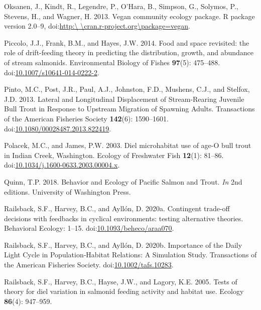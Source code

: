 \documentclass[]{article}
\begin{document}
\hypertarget{ref-Oskanen2013}{}
Oksanen, J., Kindt, R., Legendre, P., O'Hara, B., Simpson, G., Solymos,
P., Stevens, H., and Wagner, H. 2013. Vegan community ecology package. R
package version 2.0--9,
doi:\href{https://doi.org/http:/\%20/cran.r-project.org/package=vegan}{http:\textbackslash{} \textbackslash{}cran.r-project.org\textbackslash{}package=vegan}.

\hypertarget{ref-Piccolo2014}{}
Piccolo, J.J., Frank, B.M., and Hayes, J.W. 2014. Food and space
revisited: the role of drift-feeding theory in predicting the
distribution, growth, and abundance of stream salmonids. Environmental
Biology of Fishes \textbf{97}(5): 475--488.
doi:\href{https://doi.org/10.1007/s10641-014-0222-2}{10.1007/s10641-014-0222-2}.

\hypertarget{ref-Pinto2013}{}
Pinto, M.C., Post, J.R., Paul, A.J., Johnston, F.D., Mushens, C.J., and
Stelfox, J.D. 2013. Lateral and Longitudinal Displacement of
Stream-Rearing Juvenile Bull Trout in Response to Upstream Migration of
Spawning Adults. Transactions of the American Fisheries Society
\textbf{142}(6): 1590--1601.
doi:\href{https://doi.org/10.1080/00028487.2013.822419}{10.1080/00028487.2013.822419}.

\hypertarget{ref-Polacek2003a}{}
Polacek, M.C., and James, P.W. 2003. Diel microhabitat use of age-O bull
trout in Indian Creek, Washington. Ecology of Freshwater Fish
\textbf{12}(1): 81--86.
doi:\href{https://doi.org/10.1034/j.1600-0633.2003.00004.x}{10.1034/j.1600-0633.2003.00004.x}.

\hypertarget{ref-Quinn2018}{}
Quinn, T.P. 2018. Behavior and Ecology of Pacific Salmon and Trout.
\emph{In} 2nd editions. University of Washington Press.

\hypertarget{ref-Railsback2020}{}
Railsback, S.F., Harvey, B.C., and Ayllón, D. 2020a. Contingent
trade-off decisions with feedbacks in cyclical environments: testing
alternative theories. Behavioral Ecology: 1--15.
doi:\href{https://doi.org/10.1093/beheco/araa070}{10.1093/beheco/araa070}.

\hypertarget{ref-Railsback2020b}{}
Railsback, S.F., Harvey, B.C., and Ayllón, D. 2020b. Importance of the
Daily Light Cycle in Population‐Habitat Relations: A Simulation Study.
Transactions of the American Fisheries Society.
doi:\href{https://doi.org/10.1002/tafs.10283}{10.1002/tafs.10283}.

\hypertarget{ref-Railsback2005}{}
Railsback, S.F., Harvey, B.C., Hayse, J.W., and Lagory, K.E. 2005. Tests
of theory for diel variation in salmonid feeding activity and habitat
use. Ecology \textbf{86}(4): 947--959.
\end{document}

